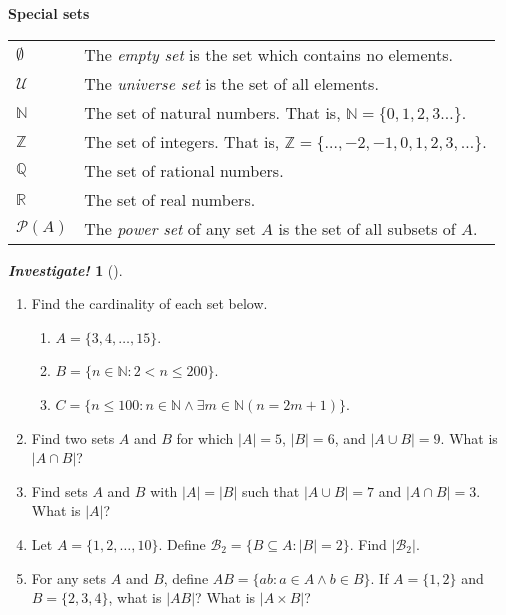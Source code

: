 \documentclass[10pt,]{book}
\theoremstyle{plain}
\theoremstyle{definition}
\theoremstyle{definition}
\newtheorem{activity}[project]{\emph{Investigate!}}
\theoremstyle{definition}
\def\N{\mathbb N}
\def\Z{\mathbb Z}
\def\Q{\mathbb Q}
\def\R{\mathbb R}
\def\U{\mathcal U}
\def\pow{\mathcal P}
\def\st{:}
\newcommand{\lt}{ < }
\begin{document}
\begin{mdframed}[style=assemblage]%
\noindent\textbf{\large Special sets}\label{assemblage-2}\par\medskip

        \begin{tabular}{ll}
\(\emptyset\)
            &The \emph{empty set} is the set which contains no elements.\tabularnewline[0pt]

              \(\U\)
            &The \emph{universe set} is the set of all elements.\tabularnewline[0pt]

              \(\N\)
            &The set of natural numbers. That is, \(\N = \{0, 1, 2, 3\ldots\}\).\tabularnewline[0pt]

              \(\Z\)
            &The set of integers. That is, \(\Z = \{\ldots, -2, -1, 0, 1, 2, 3, \ldots\}\).\tabularnewline[0pt]

              \(\Q\)
            &The set of rational numbers.\tabularnewline[0pt]

              \(\R\)
            &The set of real numbers.\tabularnewline[0pt]

              \(\pow(A)\)

            &The \emph{power set} of any set \(A\) is the set of all subsets of \(A\).
\end{tabular}

\end{mdframed}
\begin{activity}[]\label{activity-2}
\leavevmode%
\begin{enumerate}
\item\hypertarget{li-16}{}
            Find the cardinality of each set below.

          \begin{enumerate}
\item\hypertarget{li-17}{}\(A = \{3,4,\ldots, 15\}\).\item\hypertarget{li-18}{}\(B = \{n \in \N \st 2 \lt  n \le 200\}\).\item\hypertarget{li-19}{}\(C = \{n \le 100 \st n \in \N \wedge \exists m \in \N (n = 2m+1)\}\).\end{enumerate}
\item\hypertarget{li-20}{}
          Find two sets \(A\) and \(B\) for which \(|A| = 5\), \(|B| = 6\), and \(|A\cup B| = 9\). What is \(|A \cap B|\)?
      \item\hypertarget{li-21}{}
          Find sets \(A\) and \(B\) with \(|A| = |B|\) such that \(|A\cup B| = 7\) and \(|A \cap B| = 3\). What is \(|A|\)?

        \item\hypertarget{li-22}{}
              Let \(A = \{1,2,\ldots, 10\}\). Define \(\mathcal{B}_2 = \{B \subseteq A \st |B| = 2\}\). Find \(|\mathcal{B}_2|\).
        \item\hypertarget{li-23}{}
            For any sets \(A\) and \(B\), define \(AB = \{ab \st a\in A \wedge b \in B\}\). If \(A = \{1,2\}\) and \(B = \{2,3,4\}\), what is \(|AB|\)? What is \(|A \times B|\)?
        \end{enumerate}
\end{activity}
\end{document}
